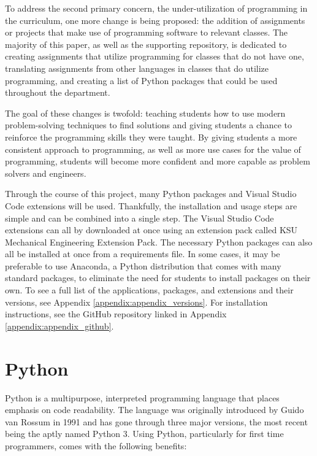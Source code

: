To address the second primary concern, the under-utilization of programming in the curriculum, one more
change is being proposed: the addition of assignments or projects that make use of programming software
to relevant classes. The majority of this paper, as
well as the supporting repository, is dedicated to creating assignments that utilize programming for classes
that do not have one, translating assignments from other languages in classes that do utilize programming,
and creating a list of Python packages that could be used throughout the department.

The goal of these changes is twofold: teaching students how to use modern problem-solving techniques to find 
solutions and giving students a chance to reinforce the programming skills they were taught. By giving
students a more consistent approach to programming, as well as more use cases for the value of programming,
students will become more confident and more capable as problem solvers and engineers.

Through the course of this project, many Python packages and Visual Studio Code extensions will
be used. Thankfully, the installation and usage steps are simple and can be combined into a single 
step. The Visual Studio Code extensions can all by downloaded at once using an
extension pack called KSU Mechanical Engineering Extension Pack. The necessary Python packages can also
all be installed at once from a requirements file. In some cases, it may be preferable to use Anaconda,
a Python distribution that comes with many standard packages, to eliminate the need for students to install
packages on their own. To see a full list of the applications, packages, and extensions and their versions, 
see Appendix \ref{appendix:appendix_versions}. For installation instructions, see the GitHub repository linked 
in Appendix \ref{appendix:appendix_github}. 

\section{Python}

Python is a multipurpose, interpreted programming language that places emphasis on code readability. The language
was originally introduced by Guido van Rossum in 1991 and has gone through three major versions,
the most recent being the aptly named Python 3. Using Python, particularly for first time programmers,
comes with the following benefits:

